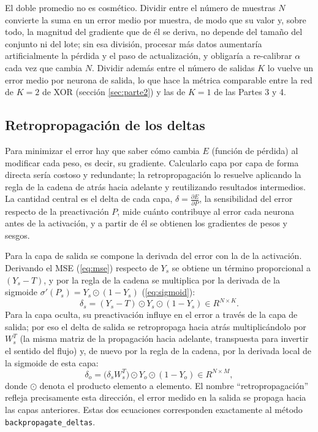 \documentclass[11pt,a4paper]{article}
\begin{document}
El doble promedio no es cosmético. Dividir entre el número de muestras $N$
convierte la suma en un error medio por muestra, de modo que su valor y,
sobre todo, la magnitud del gradiente que de él se deriva, no depende del
tamaño del conjunto ni del lote; sin esa división, procesar más datos
aumentaría artificialmente la pérdida y el paso de actualización, y obligaría a
re-calibrar $\alpha$ cada vez que cambia $N$. Dividir además entre el número de
salidas $K$ lo vuelve un error medio por neurona de salida, lo que hace la
métrica comparable entre la red de $K{=}2$ de XOR (sección \ref{sec:parte2}) y las de
$K{=}1$ de las Partes 3 y 4.

\subsection{Retropropagación de los deltas}\label{sec:backprop}

Para minimizar el error hay que saber cómo cambia $E$ (función de pérdida) al modificar cada peso, es
decir, su gradiente. Calcularlo capa por capa de forma directa sería costoso y
redundante; la retropropagación \cite{rumelhart1986} lo resuelve
aplicando la regla de la cadena de atrás hacia adelante y reutilizando
resultados intermedios. La cantidad central es el delta de cada capa,
$\delta=\frac{\partial E}{\partial P}$, la sensibilidad del error respecto de
la preactivación $P$, mide cuánto contribuye al error cada neurona
antes de la activación, y a partir de él se obtienen los gradientes de
pesos y sesgos.

Para la capa de salida se compone la derivada del error con la de la activación.
Derivando el MSE (\cref{eq:mse}) respecto de $Y_s$ se obtiene un término
proporcional a $(Y_s-T)$, y por la regla de la cadena se
multiplica por la derivada de la sigmoide $\sigma'(P_s)=
Y_s\odot(1-Y_s)$ (\cref{eq:sigmoid}):
\begin{equation}
  \delta_s = (Y_s-T) \odot
                  Y_s \odot (1 - Y_s) \in R^{N \times K}.
  \label{eq:delta_s}
\end{equation}
Para la capa oculta, su preactivación influye en el error a través de la
capa de salida; por eso el delta de salida se retropropaga hacia atrás
multiplicándolo por $W_s^T$ (la misma matriz de la propagación hacia
adelante, transpuesta para invertir el sentido del flujo) y, de nuevo por la regla
de la cadena, por la derivada local de la sigmoide de esta capa:
\begin{equation}
  \delta_o = \bigl(\delta_s W_s^T\bigr)\odot
                  Y_o \odot (1-Y_o) \in R^{N \times M},
  \label{eq:delta_o}
\end{equation}
donde $\odot$ denota el producto elemento a elemento.
El nombre ``retropropagación'' refleja precisamente esta dirección, el error
medido en la salida se propaga hacia las capas anteriores. Estas dos ecuaciones
corresponden exactamente al método \texttt{backpropagate\_deltas}.
\end{document}
